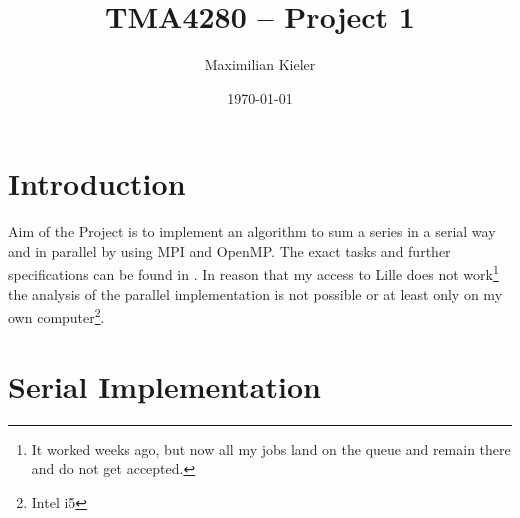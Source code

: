 







\title{TMA4280 -- Project 1}
\author{Maximilian Kieler}
\date{\today}

\maketitle


\section{Introduction}

Aim of the Project is to implement an algorithm to sum a series in a serial way and in parallel by using MPI and OpenMP. The exact tasks and further specifications can be found in \cite{}. In reason that my access to Lille does not work\footnote{It worked weeks ago, but now all my jobs land on the queue and remain there and do not get accepted.} the analysis of the parallel implementation is not possible or at least only on my own computer\footnote{Intel i5}.  




\section{Serial Implementation}

